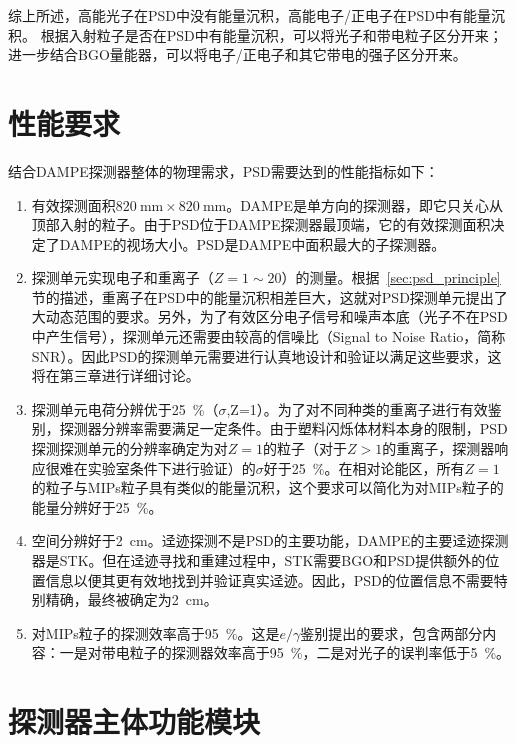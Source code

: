 综上所述，高能光子在PSD中没有能量沉积，高能电子/正电子在PSD中有能量沉积。
根据入射粒子是否在PSD中有能量沉积，可以将光子和带电粒子区分开来；进一步结合BGO量能器，可以将电子/正电子和其它带电的强子区分开来。

\section{性能要求}
\label{sec:psd_requirements}
结合DAMPE探测器整体的物理需求，PSD需要达到的性能指标如下：
\begin{enumerate}
	\item 有效探测面积$\SI{820}{\milli\meter}\times\SI{820}{\milli\meter}$。DAMPE是单方向的探测器，即它只关心从顶部入射的粒子。由于PSD位于DAMPE探测器最顶端，它的有效探测面积决定了DAMPE的视场大小。PSD是DAMPE中面积最大的子探测器。
	\item 探测单元实现电子和重离子（$Z=1\sim20$）的测量。根据~\ref{sec:psd_principle}节的描述，重离子在PSD中的能量沉积相差巨大，这就对PSD探测单元提出了大动态范围的要求。另外，为了有效区分电子信号和噪声本底（光子不在PSD中产生信号），探测单元还需要由较高的信噪比（Signal to Noise Ratio，简称SNR）。因此PSD的探测单元需要进行认真地设计和验证以满足这些要求，这将在第三章进行详细讨论。
	\item 探测单元电荷分辨优于\SI{25}{\percent}（$\sigma$,Z=1）。为了对不同种类的重离子进行有效鉴别，探测器分辨率需要满足一定条件。由于塑料闪烁体材料本身的限制，PSD探测探测单元的分辨率确定为对$Z=1$的粒子（对于$Z>1$的重离子，探测器响应很难在实验室条件下进行验证）的$\sigma$好于\SI{25}{\percent}。在相对论能区，所有$Z=1$的粒子与MIPs粒子具有类似的能量沉积，这个要求可以简化为对MIPs粒子的能量分辨好于\SI{25}{\percent}。
	\item 空间分辨好于\SI{2}{\centi\meter}。迳迹探测不是PSD的主要功能，DAMPE的主要迳迹探测器是STK。但在迳迹寻找和重建过程中，STK需要BGO和PSD提供额外的位置信息以便其更有效地找到并验证真实迳迹。因此，PSD的位置信息不需要特别精确，最终被确定为\SI{2}{\centi\meter}。
	\item 对MIPs粒子的探测效率高于\SI{95}{\percent}。这是$e/\gamma$鉴别提出的要求，包含两部分内容：一是对带电粒子的探测器效率高于\SI{95}{\percent}，二是对光子的误判率低于\SI{5}{\percent}。
\end{enumerate}

\section{探测器主体功能模块}

